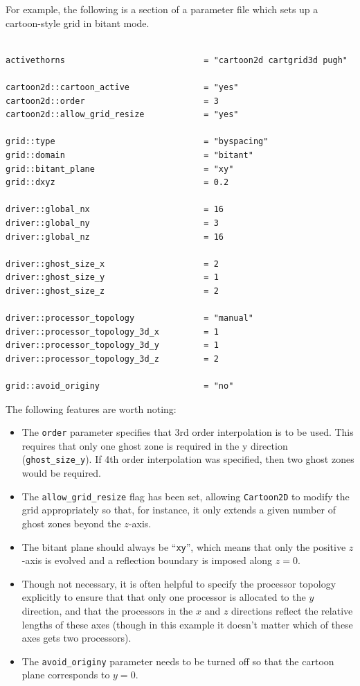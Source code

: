 \documentclass{article}
\begin{document}
For example, the following is a section of a parameter file which sets
up a cartoon-style grid in bitant mode.
\begin{verbatim}

activethorns                            = "cartoon2d cartgrid3d pugh"

cartoon2d::cartoon_active               = "yes"
cartoon2d::order                        = 3
cartoon2d::allow_grid_resize            = "yes"

grid::type                              = "byspacing"
grid::domain                            = "bitant"
grid::bitant_plane                      = "xy"
grid::dxyz                              = 0.2

driver::global_nx                       = 16
driver::global_ny                       = 3
driver::global_nz                       = 16

driver::ghost_size_x                    = 2
driver::ghost_size_y                    = 1
driver::ghost_size_z                    = 2

driver::processor_topology              = "manual"
driver::processor_topology_3d_x         = 1
driver::processor_topology_3d_y         = 1
driver::processor_topology_3d_z         = 2

grid::avoid_originy                     = "no"

\end{verbatim}
The following features are worth noting:
\begin{itemize}

  \item The \texttt{order} parameter specifies that 3rd order
  interpolation is to be used. This requires that only one ghost zone
  is required in the y direction (\texttt{ghost\_size\_y}). If 4th
  order interpolation was specified, then two ghost zones would be
  required.

  \item The \texttt{allow\_grid\_resize} flag has been set, allowing
  \texttt{Cartoon2D} to modify the grid appropriately so that, for
  instance, it only extends a given number of ghost zones beyond the
  $z$-axis.

  \item The bitant plane should always be ``\texttt{xy}'', which means
  that only the positive $z$-axis is evolved and a reflection boundary
  is imposed along $z=0$.

  \item Though not necessary, it is often helpful to specify the
  processor topology explicitly to ensure that that only one processor
  is allocated to the $y$ direction, and that the processors in the
  $x$ and $z$ directions reflect the relative lengths of these axes
  (though in this example it doesn't matter which of these axes gets
  two processors).

  \item The \texttt{avoid\_originy} parameter needs to be turned off
    so that the cartoon plane corresponds to $y=0$.

\end{itemize}
\end{document}
